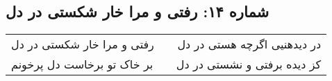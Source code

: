 \begin{center}
\section*{شماره ۱۴: رفتی و مرا خار شکستی در دل}
\label{sec:014}
\begin{longtable}{l p{0.5cm} r}
رفتی و مرا خار شکستی در دل
&&
در دیدهنیی اگرچه هستی در دل
\\
بر خاک تو برخاست دل پرخونم
&&
کز دیده برفتی و نشستی در دل
\\
\end{longtable}
\end{center}
